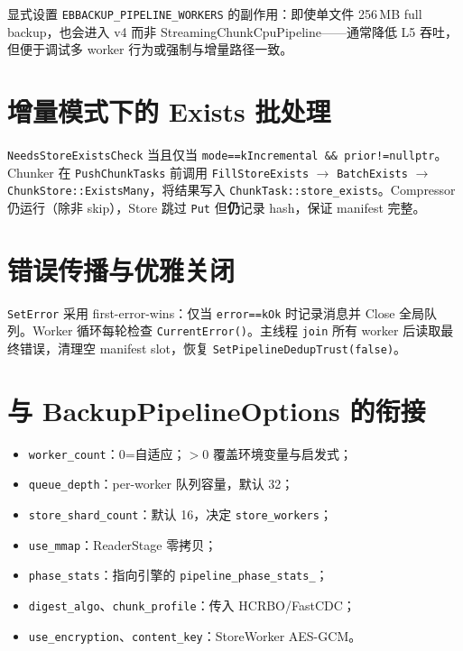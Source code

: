 显式设置 \texttt{EBBACKUP\_PIPELINE\_WORKERS} 的副作用：即使单文件 256\,MB full backup，也会进入 v4 而非 StreamingChunkCpuPipeline——通常降低 L5 吞吐，但便于调试多 worker 行为或强制与增量路径一致。

\section{增量模式下的 Exists 批处理}

\texttt{NeedsStoreExistsCheck} 当且仅当 \texttt{mode==kIncremental \&\& prior!=nullptr}。Chunker 在 \texttt{PushChunkTasks} 前调用 \texttt{FillStoreExists} $\rightarrow$ \texttt{BatchExists} $\rightarrow$ \texttt{ChunkStore::ExistsMany}，将结果写入 \texttt{ChunkTask::store\_exists}。Compressor 仍运行（除非 skip），Store 跳过 \texttt{Put} 但\textbf{仍}记录 hash，保证 manifest 完整。

\section{错误传播与优雅关闭}

\texttt{SetError} 采用 first-error-wins：仅当 \texttt{error==kOk} 时记录消息并 Close 全局队列。Worker 循环每轮检查 \texttt{CurrentError()}。主线程 \texttt{join} 所有 worker 后读取最终错误，清理空 manifest slot，恢复 \texttt{SetPipelineDedupTrust(false)}。

\section{与 BackupPipelineOptions 的衔接}

\begin{structbox}
\begin{itemize}[nosep]
  \item \texttt{worker\_count}：0=自适应；$>$0 覆盖环境变量与启发式；
  \item \texttt{queue\_depth}：per-worker 队列容量，默认 32；
  \item \texttt{store\_shard\_count}：默认 16，决定 \texttt{store\_workers}；
  \item \texttt{use\_mmap}：ReaderStage 零拷贝；
  \item \texttt{phase\_stats}：指向引擎的 \texttt{pipeline\_phase\_stats\_}；
  \item \texttt{digest\_algo}、\texttt{chunk\_profile}：传入 HCRBO/FastCDC；
  \item \texttt{use\_encryption}、\texttt{content\_key}：StoreWorker AES-GCM。
\end{itemize}
\end{structbox}

